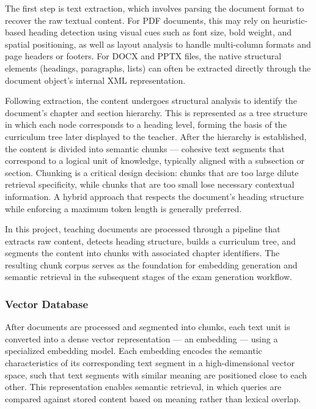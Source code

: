 \documentclass[12pt,a4paper]{article}
\begin{document}
The first step is text extraction, which involves parsing the document format to recover the raw textual content. For PDF documents, this may rely on heuristic-based heading detection using visual cues such as font size, bold weight, and spatial positioning, as well as layout analysis to handle multi-column formats and page headers or footers. For DOCX and PPTX files, the native structural elements (headings, paragraphs, lists) can often be extracted directly through the document object's internal XML representation.

Following extraction, the content undergoes structural analysis to identify the document's chapter and section hierarchy. This is represented as a tree structure in which each node corresponds to a heading level, forming the basis of the curriculum tree later displayed to the teacher. After the hierarchy is established, the content is divided into semantic chunks — cohesive text segments that correspond to a logical unit of knowledge, typically aligned with a subsection or section. Chunking is a critical design decision: chunks that are too large dilute retrieval specificity, while chunks that are too small lose necessary contextual information. A hybrid approach that respects the document's heading structure while enforcing a maximum token length is generally preferred.

In this project, teaching documents are processed through a pipeline that extracts raw content, detects heading structure, builds a curriculum tree, and segments the content into chunks with associated chapter identifiers. The resulting chunk corpus serves as the foundation for embedding generation and semantic retrieval in the subsequent stages of the exam generation workflow.

\subsubsection{Vector Database}

After documents are processed and segmented into chunks, each text unit is converted into a dense vector representation — an embedding — using a specialized embedding model. Each embedding encodes the semantic characteristics of its corresponding text segment in a high-dimensional vector space, such that text segments with similar meaning are positioned close to each other. This representation enables semantic retrieval, in which queries are compared against stored content based on meaning rather than lexical overlap.
\end{document}
